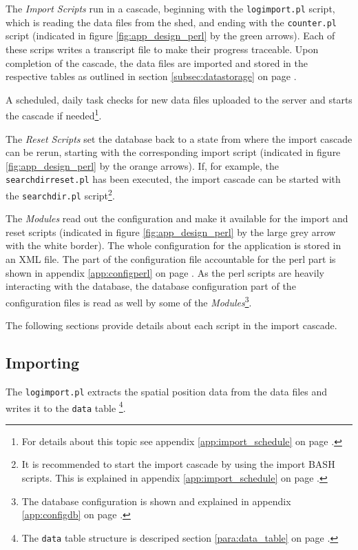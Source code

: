 The \textit{Import Scripts} run in a cascade, beginning with the \lstinline|logimport.pl| script, which is reading the data files from the shed, and ending with the \lstinline|counter.pl| script (indicated in figure \ref{fig:app_design_perl} by the green arrows). Each of these scrips writes a transcript file to make their progress traceable. Upon completion of the cascade, the data files are imported and stored in the respective tables as outlined in section \ref{subsec:datastorage} on page \pageref{subsec:datastorage}.

A scheduled, daily task checks for new data files uploaded to the server and starts the cascade if needed\footnote{For details about this topic see appendix \ref{app:import_schedule} on page \pageref{app:import_schedule}.}.

The \textit{Reset Scripts} set the database back to a state from where the import cascade can be rerun,  starting with the corresponding import script (indicated in figure \ref{fig:app_design_perl} by the orange arrows). If, for example, the \lstinline|searchdirreset.pl| has been executed, the import cascade can be started with the \lstinline|searchdir.pl| script\footnote{It is recommended to start the import cascade by using the import BASH scripts. This is explained in appendix \ref{app:import_schedule} on page \pageref{app:import_schedule}.}.

The \textit{Modules} read out the configuration and make it available for the import and reset scripts (indicated in figure \ref{fig:app_design_perl} by the large grey arrow with the white border). The whole configuration for the application is stored in an XML file. The part of the configuration file accountable for the perl part is shown in appendix \ref{app:configperl} on page \pageref{app:configperl}. As the perl scripts are heavily interacting with the database, the database configuration part of the configuration files is read as well by some of the \textit{Modules}\footnote{The database configuration is shown and explained in appendix \ref{app:configdb} on page \pageref{app:configdb}.}. 

The following sections provide details about each script in the import cascade.

\subsection{Importing}
\label{subsec:importing}

The \lstinline|logimport.pl| extracts the spatial position data from the data files and writes it to the \lstinline|data| table \footnote{The \lstinline|data| table structure is descriped section \ref{para:data_table} on page \pageref{para:data_table}.}.

